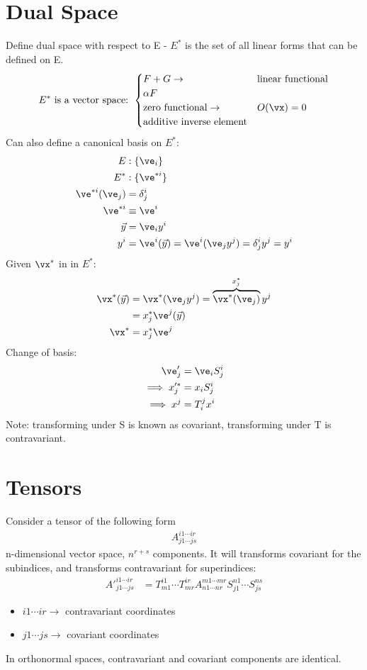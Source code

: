 \documentclass[cplx.tex]{subfiles}
\begin{document}
\section{Dual Space}
Define dual space with respect to E - $E^*$ is the set of all linear forms that can be defined on E.
\begin{equation}
    E^* \text{ is a vector space: } \begin{cases} F+G \to & \text{linear functional} \\ \alpha F & \\ \text{zero functional} \to & O(\vx) = 0 \\ \text{additive inverse element} & \end{cases}
\end{equation}
Can also define a canonical basis on $E^*$:
\begin{align}
    E&: \{\ve_i\} \\
    E^*&: \{\ve^{*i}\} \\
    \ve^{*i}(\ve_j) &= \delta^i_j \\
    \ve^{*i} &\equiv \ve^i \\
    \vec{y} &= \ve_iy^i \\
    y^i &= \ve^i(\vec{y}) = \ve^i(\ve_jy^j) = \delta^i_jy^j = y^i
\end{align}
Given $\vx^*$ in in $E^*$:
\begin{align}
    \vx^*(\vec{y}) &= \vx^*(\ve_jy^j) = \overbrace{\vx^*(\ve_j)}^{x_j^*}y^j \\
                   &= x_j^*\ve^j(\vec{y}) \\
    \vx^* &= x_j^* \ve^j
\end{align}
Change of basis:
\begin{align}
    \ve'_j &= \ve_iS^i_j \\
    \implies x'^*_j &= x_iS^i_j \\
    \implies x^j &= T^j_ix^i
\end{align}
Note: transforming under S is known as covariant, transforming under T is contravariant.

\section{Tensors}
Consider a tensor of the following form
\begin{align}
    A^{i1\cdots ir}_{j1\cdots js}
\end{align}
n-dimensional vector space, $n^{r+s}$ components.
It will transforms covariant for the subindices, and transforms contravariant for superindices:
\begin{align}
    A'^{i1\cdots ir}_{j1 \cdots js} &= T^{i1}_{m1}\cdots T^{ir}_{mr} A^{m1\cdots mr}_{n1\cdots nr}S^{n1}_{j1}\cdots S^{ns}_{js} 
\end{align}
\begin{itemize}
    \item $i1 \cdots ir \to$ contravariant coordinates
    \item $j1 \cdots js \to$ covariant coordinates
\end{itemize}
In orthonormal spaces, contravariant and covariant components are identical.
\end{document}

